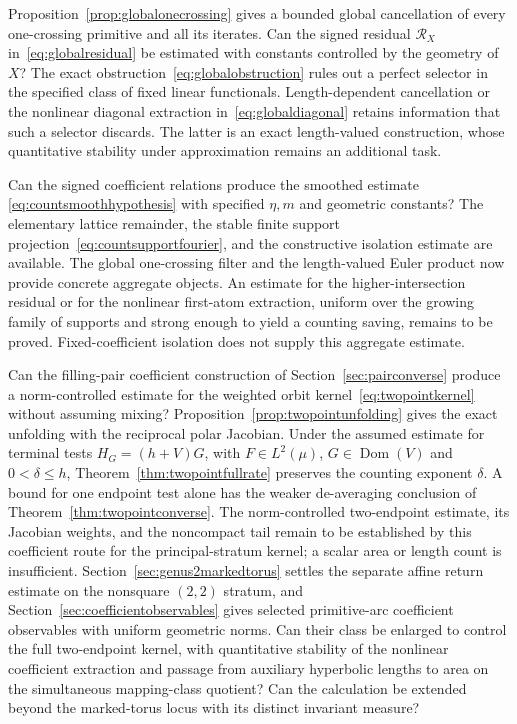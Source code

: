 \begin{question}
Proposition~\ref{prop:globalonecrossing} gives a bounded global
cancellation of every one-crossing primitive and all its iterates.
Can the signed residual $\mathcal R_X$ in~\eqref{eq:globalresidual}
be estimated with constants controlled by the geometry of $X$?
The exact obstruction~\eqref{eq:globalobstruction} rules out a
perfect selector in the specified class of fixed linear functionals.
Length-dependent cancellation or the nonlinear diagonal extraction
in~\eqref{eq:globaldiagonal} retains information that such a selector
discards. The latter is an exact length-valued construction, whose
quantitative stability under approximation remains an additional task.
\end{question}

\begin{question}
Can the signed coefficient relations produce the smoothed estimate
\eqref{eq:countsmoothhypothesis} with specified $\eta,m$ and geometric
constants? The elementary lattice remainder, the stable finite support
projection~\eqref{eq:countsupportfourier}, and the constructive isolation
estimate are available. The global one-crossing filter and the
length-valued Euler product now provide concrete aggregate objects.
An estimate for the higher-intersection residual or for the nonlinear
first-atom extraction, uniform over the growing family of supports and
strong enough to yield a counting saving, remains to be proved.
Fixed-coefficient isolation does not supply this aggregate estimate.
\end{question}

\begin{question}
Can the filling-pair coefficient construction of
Section~\ref{sec:pairconverse} produce a norm-controlled estimate
for the weighted orbit kernel~\eqref{eq:twopointkernel} without
assuming mixing? Proposition~\ref{prop:twopointunfolding} gives the
exact unfolding with the reciprocal polar Jacobian. Under the assumed
estimate for terminal tests $H_G=(h+V)G$, with $F\in L^2(\mu)$,
$G\in\operatorname{Dom}(V)$ and $0<\delta\le h$,
Theorem~\ref{thm:twopointfullrate} preserves
the counting exponent $\delta$. A bound for one endpoint test alone
has the weaker de-averaging conclusion of
Theorem~\ref{thm:twopointconverse}. The norm-controlled two-endpoint
estimate, its Jacobian weights, and the noncompact tail remain to be
established by this coefficient route for the principal-stratum kernel;
a scalar area or length count is insufficient.
Section~\ref{sec:genus2markedtorus}
settles the separate affine return estimate on the nonsquare $(2,2)$
stratum, and Section~\ref{sec:coefficientobservables} gives selected
primitive-arc coefficient observables with uniform geometric norms.
Can their class be enlarged to control the full two-endpoint kernel,
with quantitative stability of the nonlinear coefficient extraction
and passage from auxiliary hyperbolic lengths to area on the
simultaneous mapping-class quotient? Can the calculation be extended
beyond the marked-torus locus with its distinct invariant measure?
\end{question}

